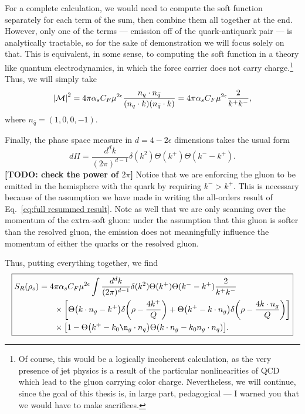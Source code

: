 \documentclass[12pt,twoside,class=../reedthesis, crop=false]{standalone}
\providecommand{\cM}{\mathcal{M}}
\begin{document}
	For a complete calculation, we would need to compute the soft function separately for each term of the sum, then combine them all together at the end. However, only one of the terms --- emission off of the quark-antiquark pair --- is analytically tractable, so for the sake of demonstration we will focus solely on that. This is equivalent, in some sense, to computing the soft function in a theory like quantum electrodynamics, in which the force carrier does not carry charge.\footnote{Of course, this would be a logically incoherent calculation, as the very presence of jet physics is a result of the particular nonlinearities of QCD which lead to the gluon carrying color charge. Nevertheless, we will continue, since the goal of this thesis is, in large part, pedagogical --- I warned you that we would have to make sacrifices.} Thus, we will simply take
	\begin{equation}
		\abs{\cM}^2 = 4\pi\alpha_s C_F \mu^{2\epsilon} \frac{n_q \cdot n_{\bar q}}{(n_q \cdot k) (n_{\bar q} \cdot k)} = 4\pi\alpha_s C_F \mu^{2\epsilon} \frac{2}{k^+ k^-},
	\end{equation}
	where $n_{\bar q} = (1, 0, 0, -1)$.

	Finally, the phase space measure in $d = 4 - 2\epsilon$ dimensions takes the usual form
	\begin{equation}
		d\Pi = \frac{d^d k}{(2 \pi)^{d - 1}} \delta(k^2) \Theta(k^+) \Theta(k^- - k^+).
	\end{equation}
	{\color{red}\textbf{[TODO: check the power of $2\pi$]}} Notice that we are enforcing the gluon to be emitted in the hemisphere with the quark by requiring $k^- > k^+$. This is necessary because of the assumption we have made in writing the all-orders result of Eq.~\ref{eq:full resummed result}. Note as well that we are only scanning over the momentum of the extra-soft gluon: under the assumption that this gluon is softer than the resolved gluon, the emission does not meaningfully influence the momentum of either the quarks or the resolved gluon.

	Thus, putting everything together, we find
	\begin{equation}\label{eq:soft function general coords}
	\boxed{
	\begin{aligned}
		S_R(\rho_s) = 4&\pi\alpha_s C_F \mu^{2\epsilon} \int \frac{d^d k}{(2\pi)^{d - 1}} \delta(k^2) \Theta(k^+) \Theta(k^- - k^+) \frac{2}{k^+ k^-} \\
		&\times \qty[\Theta\qty(k \cdot n_g - k^+) \delta\qty(\rho - \frac{4 k^+}{Q}) + \Theta\qty(k^+ - k \cdot n_g) \delta\qty(\rho - \frac{4 k \cdot n_g}{Q})] \\
		&\times \qty[1 - \Theta\qty(k^+ - k_0 \n_g \cdot n_q) \Theta(k\cdot n_g - k_0 n_g \cdot n_q)].
	\end{aligned}
	}
	\end{equation}
\end{document}
